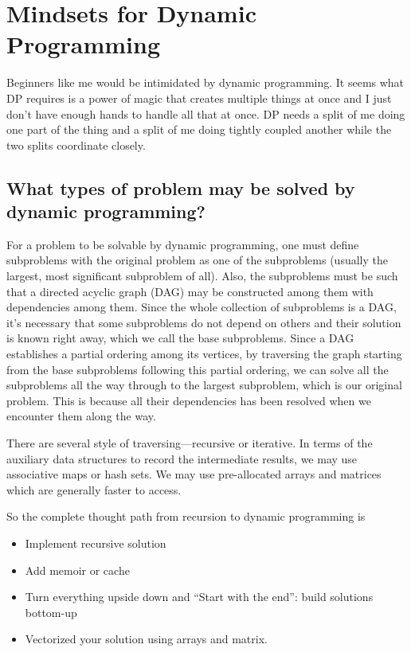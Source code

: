 
\chapter{Mindsets for Dynamic Programming} \label{ch:dp}

Beginners like me would be intimidated by dynamic programming.
It seems what DP requires is a power of magic that creates multiple things at once and I just don't
have enough hands to handle all that at once.
DP needs a split of me doing one part of the thing and a split of me doing tightly coupled another
while the two splits coordinate closely.

\section{What types of problem may be solved by dynamic programming?}
\label{sec:types-of-problem-solved-by-dp}
For a problem to be solvable by dynamic programming, one must define
subproblems with the original problem as one of the subproblems (usually the largest, most
significant subproblem of all).
Also, the subproblems must be such that a directed acyclic graph (DAG) may be constructed among
them with dependencies among them.
Since the whole collection of subproblems is a DAG, it's necessary that some subproblems do not
depend on others and their solution is known right away, which we call the base subproblems.
Since a DAG establishes a partial ordering among its vertices, by traversing the graph starting
from the base subproblems following this partial ordering, we can solve all the subproblems  all
the way through to the largest subproblem, which is our original problem.
This is because all their dependencies has been resolved when we encounter them along the way.

There are several style of traversing---recursive or iterative.
In terms of the  auxiliary data structures to record the intermediate results, we may use
associative maps or hash sets.
We may use pre-allocated arrays and matrices which are generally faster to access.

So the complete thought path from recursion to dynamic programming is
\begin{itemize}
    \item Implement recursive solution
    \item Add memoir or cache
    \item Turn everything upside down and ``Start with the end'': build solutions bottom-up
    \item Vectorized your solution using arrays and matrix.
\end{itemize}

